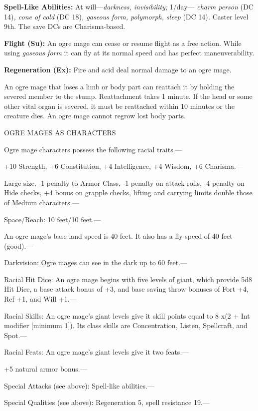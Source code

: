 \documentclass{article}
\begin{document}
\textbf{Spell-Like Abilities:} At will---\textit{darkness, invisibility; }1/day--- 
\textit{charm person }(DC 14)\textit{, cone of cold }(DC 18)\textit{, gaseous form, 
polymorph, sleep }(DC 14)\textit{. }Caster level 9th. The save DCs are Charisma-based.

\textbf{Flight (Su):} An ogre mage can cease or resume flight as a free action. 
While using \textit{gaseous form }it can fly at its normal speed and has perfect 
maneuverability.

\textbf{Regeneration (Ex):} Fire and acid deal normal damage to an ogre mage.

An ogre mage that loses a limb or body part can reattach it by holding the severed 
member to the stump. Reattachment takes 1 minute. If the head or some other vital 
organ is severed, it must be reattached within 10 minutes or the creature dies. 
An ogre mage cannot regrow lost body parts.

OGRE MAGES AS CHARACTERS

Ogre mage characters possess the following racial traits.--- 

\parindent=3pt
+10 Strength, +6 Constitution, +4 Intelligence, +4 Wisdom, +6 Charisma.---

\parindent=0pt
Large size. -1 penalty to Armor Class, -1 penalty on attack rolls, -4 penalty on 
Hide checks, +4 bonus on grapple checks, lifting and carrying limits double those 
of Medium characters.---

Space/Reach: 10 feet/10 feet.---

An ogre mage's base land speed is 40 feet. It also has a fly speed of 40 feet (good).---

Darkvision: Ogre mages can see in the dark up to 60 feet.---

Racial Hit Dice: An ogre mage begins with five levels of giant, which provide 5d8 
Hit Dice, a base attack bonus of +3, and base saving throw bonuses of Fort +4, 
Ref +1, and Will +1.---

Racial Skills: An ogre mage's giant levels give it skill points equal to 8 x$ $(2 
+ Int modifier [minimum 1]). Its class skills are Concentration, Listen, Spellcraft, 
and Spot.---

Racial Feats: An ogre mage's giant levels give it two feats.--- 

\parindent=3pt
+5 natural armor bonus.---

\parindent=0pt
Special Attacks (see above): Spell-like abilities.---

Special Qualities (see above): Regeneration 5, spell resistance 19.---
\end{document}
